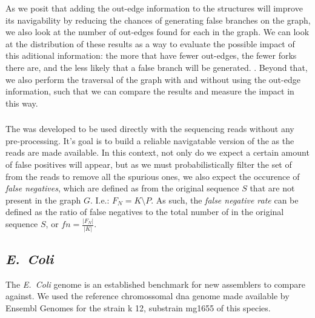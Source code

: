 
As we posit that adding the out-edge information to the structures will improve its navigability by reducing the chances of generating
false branches on the graph, we also look at the number of out-edges found for each \kmer in the graph. We can look at the distribution
of these results as a way to evaluate the possible impact of this aditional information: the more \kmers that have fewer out-edges,
the fewer forks there are, and the less likely that a false branch will be generated. . Beyond that, we also perform the traversal of the graph with and
without using the out-edge information, such that we can compare the results and measure the impact in this way.

\subsubsection{\dBCM}

The \dBCM was developed to be used directly with the sequencing reads without any pre-processing. It's goal is to build a reliable
navigatable version of the \dBG as the reads are made available. In this context, not only do we expect a certain amount of false
positives will appear, but as we must probabilistically filter the set of \kmers from the reads to remove all the spurious ones, we
also expect the occurence of \emph{false negatives}, which are defined as \kmers from the original sequence $S$ that are not present
in the graph $G$. I.e.: $F_N=K \setminus P$. As such, the \emph{false negative rate} can be defined as the ratio of false negatives
to the total number of \kmers in the original sequence $S$, or $\mathit{fn}=\frac{|F_N|}{|K|}$.

\subsubsection{\dBHT}

\subsection{\emph{E.~Coli}}

The \emph{E.~Coli} genome is an established benchmark for new assemblers to compare against. We used the reference chromossomal dna
genome made available by Ensembl Genomes for the strain k 12, substrain mg1655 of this species\cite{ecoligenome}.

